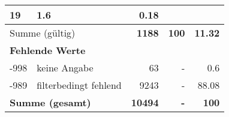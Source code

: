 \begin{longtable}{lXrrr}
       \num{19} &
       \num[round-mode=places,round-precision=2]{1.6} &
         \num[round-mode=places,round-precision=2]{0.18} \\
     \midrule
     \multicolumn{2}{l}{Summe (gültig)} &
       \textbf{\num{1188}} &
     \textbf{\num{100}} &
       \textbf{\num[round-mode=places,round-precision=2]{11.32}} \\
     \multicolumn{5}{l}{\textbf{Fehlende Werte}}\\
       -998 &
       keine Angabe &
         \num{63} &
        - &
         \num[round-mode=places,round-precision=2]{0.6} \\
       -989 &
       filterbedingt fehlend &
         \num{9243} &
        - &
         \num[round-mode=places,round-precision=2]{88.08} \\
     \midrule
     \multicolumn{2}{l}{\textbf{Summe (gesamt)}} &
          \textbf{\num{10494}} &
        \textbf{-} &
        \textbf{\num{100}} \\
     \bottomrule
     \end{longtable}
     
